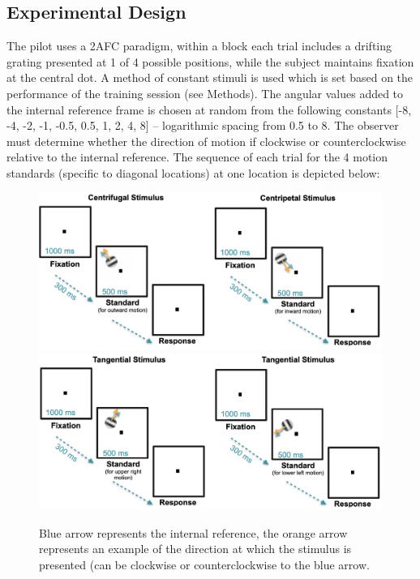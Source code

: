 \documentclass[11pt]{article} %
\begin{document}
\subsection{Experimental Design}
The pilot uses a 2AFC paradigm, within a block each trial includes a drifting grating presented at 1 of 4 possible positions, while the subject maintains fixation at the central dot. A method of constant stimuli is used which is set based on the performance of the training session (see Methods). The angular values added to the internal reference frame is chosen at random from the following constants [-8, -4, -2, -1, -0.5, 0.5, 1, 2, 4, 8] -- logarithmic spacing from 0.5 to 8. The observer must determine whether the direction of motion if clockwise or counterclockwise relative to the internal reference. The sequence of each trial for the 4 motion standards (specific to diagonal locations) at one location is depicted below:

\begin{figure}[H]
\centering %
\includegraphics[scale=.4]{Images/Radial_sequence.png}
\\
\includegraphics[scale=.4]{Images/Tang_sequence.png}
\caption{Blue arrow represents the internal reference, the orange arrow represents an example of the direction at which the stimulus is presented (can be clockwise or counterclockwise to the blue arrow.}
\end{figure}
\end{document}

